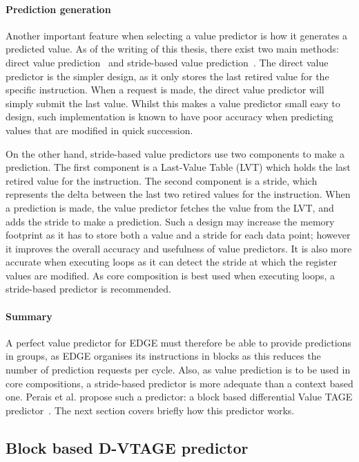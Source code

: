 \paragraph*{Prediction generation} Another important feature when selecting a value predictor is how it generates a predicted value.
As of the writing of this thesis, there exist two main methods: direct value prediction~\cite{peraisVTAGE2014} and stride-based value prediction~\cite{peraisBeBop2015}.
The direct value predictor is the simpler design, as it only stores the last retired value for the specific instruction.
When a request is made, the direct value predictor will simply submit the last value.
Whilst this makes a value predictor small easy to design, such implementation is known to have poor accuracy when predicting values that are modified in quick succession.

On the other hand, stride-based value predictors use two components to make a prediction.
The first component is a Last-Value Table (LVT) which holds the last retired value for the instruction.
The second component is a stride, which represents the delta between the last two retired values for the instruction.
When a prediction is made, the value predictor fetches the value from the LVT, and adds the stride to make a prediction.
Such a design may increase the memory footprint as it has to store both a value and a stride for each data point; however it improves the overall accuracy and usefulness of value predictors.
It is also more accurate when executing loops as it can detect the stride at which the register values are modified.
As core composition is best used when executing loops, a stride-based predictor is recommended.

\paragraph*{Summary}

A perfect value predictor for EDGE must therefore be able to provide predictions in groups, as EDGE organises its instructions in blocks as this reduces the number of prediction requests per cycle.
Also, as value prediction is to be used in core compositions, a stride-based predictor is more adequate than a context based one.
Perais et al. propose such a predictor: a block based differential Value TAGE predictor~\cite{peraisBeBop2015}.
The next section covers briefly how this predictor works.

\subsection{Block based D-VTAGE predictor}

